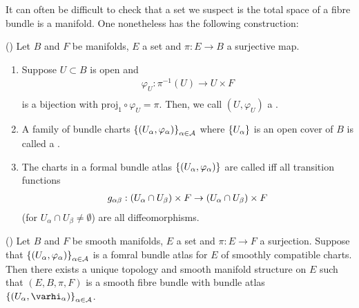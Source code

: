 \documentclass[main.tex]{subfiles}
\begin{document}
It can often be difficult to check that a set we suspect is the total space of a fibre bundle is a manifold. One nonetheless has the following construction:

\begin{defn}
() Let $B$ and $F$ be manifolds, $E$ a set and $\pi: E \to B$ a surjective map.
\begin{enumerate}
    \item Suppose $U \subset B$ is open and
    \begin{align*}
        \varphi_U : \pi^{-1}(U) \to U \times F \\
    \end{align*}
    is a bijection with $\text{proj}_1 \circ \varphi_U = \pi$. Then, we call $(U, \varphi_U)$ a .
    \item A family of bundle charts $\left\{\left( U_\alpha, \varphi_\alpha \right)\right\}_{\alpha \in \mathcal{A}}$ where $\left\{U_\alpha\right\}$ is an open cover of $B$ is called a .

    \item The charts in a formal bundle atlas $\left\{ \left( U_\alpha, \varphi_\alpha  \right) \right\}$ are called  iff all transition functions
    \begin{align*}
        g_{\alpha\beta}: \left( U_\alpha \cap U_\beta \right) \times F \to \left( U_\alpha \cap U_\beta \right) \times F
    \end{align*} (for $U_\alpha \cap U_\beta \neq \emptyset$) are all diffeomorphisms.
\end{enumerate}
\end{defn}

\begin{thm}
() Let $B$ and $F$ be smooth manifolds, $E$ a set and $\pi: E \to F$ a surjection. Suppose that $\left\{ \left(  U_\alpha, \varphi_\alpha  \right)\right\}_{\alpha \in \mathcal{A}}$ is a fomral bundle atlas for $E$ of smoothly compatible charts. Then there exists a unique topology and smooth manifold structure on $E$ such that $(E, B, \pi, F)$ is a smooth fibre bundle with bundle atlas $ \brc{ \br{U_\alpha, \varhi_\alpha} }_{\alpha \in \mathcal{A}}$.
\end{thm}
\end{document}
